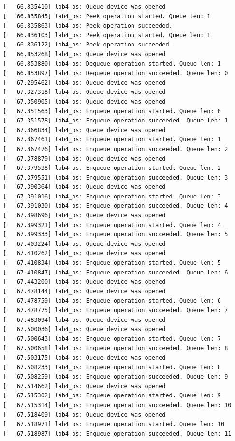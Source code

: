 \documentclass[a4paper,14pt]{extarticle}
\begin{document}
\begin{verbatim}
[   66.835410] lab4_os: Queue device was opened
[   66.835845] lab4_os: Peek operation started. Queue len: 1
[   66.835863] lab4_os: Peek operation succeeded.
[   66.836103] lab4_os: Peek operation started. Queue len: 1
[   66.836122] lab4_os: Peek operation succeeded.
[   66.853268] lab4_os: Queue device was opened
[   66.853880] lab4_os: Dequeue operation started. Queue len: 1
[   66.853897] lab4_os: Dequeue operation succeeded. Queue len: 0
[   67.295462] lab4_os: Queue device was opened
[   67.327318] lab4_os: Queue device was opened
[   67.350905] lab4_os: Queue device was opened
[   67.351563] lab4_os: Enqueue operation started. Queue len: 0
[   67.351578] lab4_os: Enqueue operation succeeded. Queue len: 1
[   67.366834] lab4_os: Queue device was opened
[   67.367461] lab4_os: Enqueue operation started. Queue len: 1
[   67.367476] lab4_os: Enqueue operation succeeded. Queue len: 2
[   67.378879] lab4_os: Queue device was opened
[   67.379538] lab4_os: Enqueue operation started. Queue len: 2
[   67.379551] lab4_os: Enqueue operation succeeded. Queue len: 3
[   67.390364] lab4_os: Queue device was opened
[   67.391016] lab4_os: Enqueue operation started. Queue len: 3
[   67.391030] lab4_os: Enqueue operation succeeded. Queue len: 4
[   67.398696] lab4_os: Queue device was opened
[   67.399321] lab4_os: Enqueue operation started. Queue len: 4
[   67.399333] lab4_os: Enqueue operation succeeded. Queue len: 5
[   67.403224] lab4_os: Queue device was opened
[   67.410262] lab4_os: Queue device was opened
[   67.410834] lab4_os: Enqueue operation started. Queue len: 5
[   67.410847] lab4_os: Enqueue operation succeeded. Queue len: 6
[   67.443200] lab4_os: Queue device was opened
[   67.478144] lab4_os: Queue device was opened
[   67.478759] lab4_os: Enqueue operation started. Queue len: 6
[   67.478775] lab4_os: Enqueue operation succeeded. Queue len: 7
[   67.483094] lab4_os: Queue device was opened
[   67.500036] lab4_os: Queue device was opened
[   67.500643] lab4_os: Enqueue operation started. Queue len: 7
[   67.500658] lab4_os: Enqueue operation succeeded. Queue len: 8
[   67.503175] lab4_os: Queue device was opened
[   67.508233] lab4_os: Enqueue operation started. Queue len: 8
[   67.508259] lab4_os: Enqueue operation succeeded. Queue len: 9
[   67.514662] lab4_os: Queue device was opened
[   67.515302] lab4_os: Enqueue operation started. Queue len: 9
[   67.515314] lab4_os: Enqueue operation succeeded. Queue len: 10
[   67.518409] lab4_os: Queue device was opened
[   67.518971] lab4_os: Enqueue operation started. Queue len: 10
[   67.518987] lab4_os: Enqueue operation succeeded. Queue len: 11

\end{verbatim}
\end{document}
